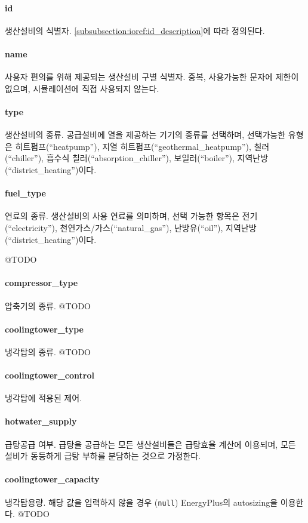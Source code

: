\paragraph{id} 생산설비의 식별자. \ref{subsubsection:ioref:id_description}에 따라 정의된다.

\paragraph{name} 사용자 편의를 위해 제공되는 생산설비 구별 식별자. 중복, 사용가능한 문자에 제한이 없으며, 시뮬레이션에 직접 사용되지 않는다.

\paragraph{type} 생산설비의 종류. 공급설비에 열을 제공하는 기기의 종류를 선택하며, 선택가능한 유형은 히트펌프(``heatpump''), 지열 히트펌프(``geothermal\_heatpump''), 칠러(``chiller''), 흡수식 칠러(``absorption\_chiller''), 보일러(``boiler''), 지역난방(``district\_heating'')이다.

\paragraph{fuel\_type} 연료의 종류. 생산설비의 사용 연료를 의미하며, 선택 가능한 항목은 전기(``electricity''), 천연가스/가스(``natural\_gas''), 난방유(``oil''), 지역난방(``district\_heating'')이다.

@TODO
\paragraph{compressor\_type} 압축기의 종류. 
@TODO
\paragraph{coolingtower\_type} 냉각탑의 종류. 
@TODO
\paragraph{coolingtower\_control} 냉각탑에 적용된 제어. 

\paragraph{hotwater\_supply} 급탕공급 여부. 급탕을 공급하는 모든 생산설비들은 급탕효율 계산에 이용되며, 모든 설비가 동등하게 급탕 부하를 분담하는 것으로 가정한다.

\paragraph{coolingtower\_capacity} 냉각탑용량. 해당 값을 입력하지 않을 경우 (\texttt{null}) EnergyPlus의 autosizing을 이용한다.
@TODO
